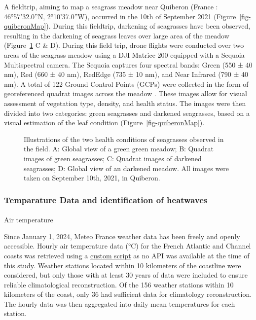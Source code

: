 \documentclass[
  number]{elsarticle}
\makeatletter
\let\oldparagraph\paragraph
\renewcommand{\paragraph}{
    \@ifstar
      \xxxParagraphStar
      \xxxParagraphNoStar
  }
\newcommand{\xxxParagraphStar}[1]{\oldparagraph*{#1}\mbox{}}
\newcommand{\xxxParagraphNoStar}[1]{\oldparagraph{#1}\mbox{}}
\makeatother
\begin{document}
A fieldtrip, aiming to map a seagrass meadow near Quiberon (France :
46°57'32.0''N, 2°10'37.0''W), occurred in the 10th of September 2021
(Figure~\ref{fig-quiberonMap}). During this fieldtrip, darkening of
seagrasses have been observed, resulting in the darkening of seagrass
leaves over large area of the meadow (Figure~\ref{fig-QuiberonImg} C \&
D). During this field trip, drone flights were conducted over two areas
of the seagrass meadow using a DJI Matrice 200 equipped with a Sequoia
Multispectral camera. The Sequoia captures four spectral bands: Green
(550 ± 40 nm), Red (660 ± 40 nm), RedEdge (735 ± 10 nm), and Near
Infrared (790 ± 40 nm). A total of 122 Ground Control Points (GCPs) were
collected in the form of georeferenced quadrat images across the meadow
. These images allow for visual assessment of vegetation type, density,
and health status. The images were then divided into two categories:
green seagrasses and darkened seagrasses, based on a visual estimation
of the leaf condition (Figure~\ref{fig-quiberonMap}).

\label{cell-fig-QuiberonImg}
\begin{figure}[H]


\caption{\label{fig-QuiberonImg}Illustrations of the two health
conditions of seagrasses observed in the field. A: Global view of a
green green meadow; B: Quadrat images of green seagrasses; C: Quadrat
images of darkened seagrasses; D: Global view of an darkened meadow. All
images were taken on September 10th, 2021, in Quiberon.}

\end{figure}%

\subsubsection{Temparature Data and identification of
heatwaves}\label{temparature-data-and-identification-of-heatwaves}

\paragraph{Air temperature}\label{air-temperature}

Since January 1, 2024, Meteo France weather data has been freely and
openly accessible. Hourly air temperature data (°C) for the French
Atlantic and Channel coasts was retrieved using a
\href{https://github.com/SigOiry/HeatWave_Seagrasses/blob/main/Scripts/MeteoFrance_Extraction.qmd}{custom
script} as no API was available at the time of this study. Weather
stations located within 10 kilometers of the coastline were considered,
but only those with at least 30 years of data were included to ensure
reliable climatological reconstruction. Of the 156 weather stations
within 10 kilometers of the coast, only 36 had sufficient data for
climatology reconstruction. The hourly data was then aggregated into
daily mean temperatures for each station.
\end{document}
